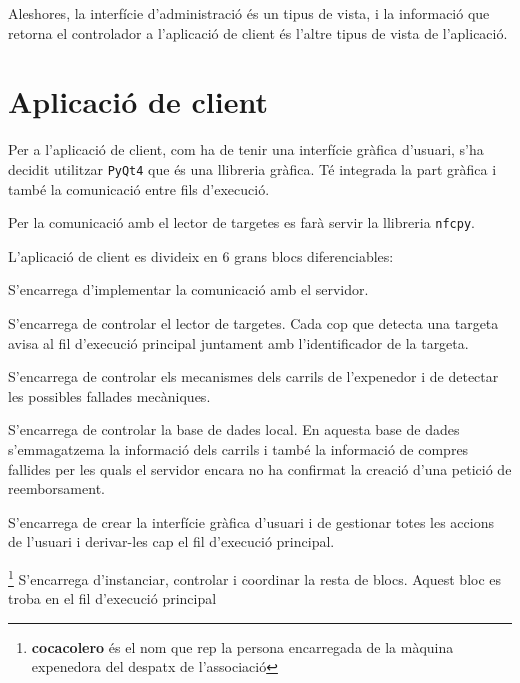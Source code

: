 Aleshores, la interfície d'administració és un tipus de vista, i la informació que retorna el controlador a l'aplicació de client és l'altre tipus de vista de l'aplicació.

\newpage
\section{Aplicació de client}
Per a l'aplicació de client, com ha de tenir una interfície gràfica d'usuari, s'ha decidit utilitzar \texttt{PyQt4}\autocite{pyqt4-tutorial} que és una llibreria gràfica. Té integrada la part gràfica i també la comunicació entre fils d'execució.

Per la comunicació amb el lector de targetes es farà servir la llibreria \texttt{nfcpy}.\autocite{nfcpy}

L'aplicació de client es divideix en 6 grans blocs diferenciables:
\begin{description}[font=\normalfont\textbf]\itemsep2pt 
\vspace{-1em}
\parskip1pt 
\item[comms] S'encarrega d'implementar la comunicació amb el servidor.
\item[card\_reader] S'encarrega de controlar el lector de targetes. Cada cop que detecta una targeta avisa al fil d'execució principal juntament amb l'identificador de la targeta.
\item[column\_controller] S'encarrega de controlar els mecanismes dels carrils de l'expenedor i de detectar les possibles fallades mecàniques.
\item[db\_controller] S'encarrega de controlar la base de dades local. En aquesta base de dades s'emmagatzema la informació dels carrils i també la informació de compres fallides per les quals el servidor encara no ha confirmat la creació d'una petició de reemborsament.
\item[graphic\_ui] S'encarrega de crear la interfície gràfica d'usuari i de gestionar totes les accions de l'usuari i derivar-les cap el fil d'execució principal.
\item[cocacolero]\footnote{\textbf{cocacolero} és el nom que rep la persona encarregada de la màquina expenedora del despatx de l'associació} S'encarrega d'instanciar, controlar i coordinar la resta de blocs. Aquest bloc es troba en el fil d'execució principal
\vspace{-1em}
\end{description}

